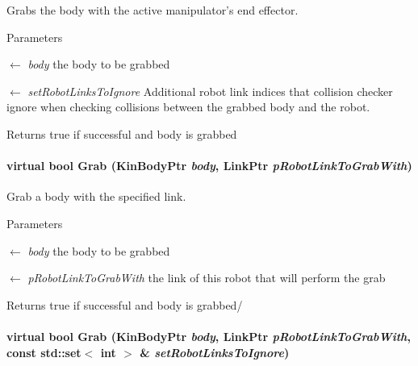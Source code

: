 Grabs the body with the active manipulator's end effector. 


\begin{DoxyParams}{Parameters}
\item[\mbox{$\leftarrow$} {\em body}]the body to be grabbed \item[\mbox{$\leftarrow$} {\em setRobotLinksToIgnore}]Additional robot link indices that collision checker ignore when checking collisions between the grabbed body and the robot. \end{DoxyParams}
\begin{DoxyReturn}{Returns}
true if successful and body is grabbed 
\end{DoxyReturn}
\hypertarget{classOpenRAVE_1_1RobotBase_a52c7267f79b4d09c583fce816a8a31df}{
\paragraph[{Grab}]{\setlength{\rightskip}{0pt plus 5cm}virtual bool Grab (KinBodyPtr {\em body}, \/  LinkPtr {\em pRobotLinkToGrabWith})}\hfill}
\label{classOpenRAVE_1_1RobotBase_a52c7267f79b4d09c583fce816a8a31df}


Grab a body with the specified link. 


\begin{DoxyParams}{Parameters}
\item[\mbox{$\leftarrow$} {\em body}]the body to be grabbed \item[\mbox{$\leftarrow$} {\em pRobotLinkToGrabWith}]the link of this robot that will perform the grab \end{DoxyParams}
\begin{DoxyReturn}{Returns}
true if successful and body is grabbed/ 
\end{DoxyReturn}
\hypertarget{classOpenRAVE_1_1RobotBase_abd0375cf84ce804abe302d3e6faddf76}{
\paragraph[{Grab}]{\setlength{\rightskip}{0pt plus 5cm}virtual bool Grab (KinBodyPtr {\em body}, \/  LinkPtr {\em pRobotLinkToGrabWith}, \/  const std::set$<$ int $>$ \& {\em setRobotLinksToIgnore})}\hfill}
\label{classOpenRAVE_1_1RobotBase_abd0375cf84ce804abe302d3e6faddf76}


